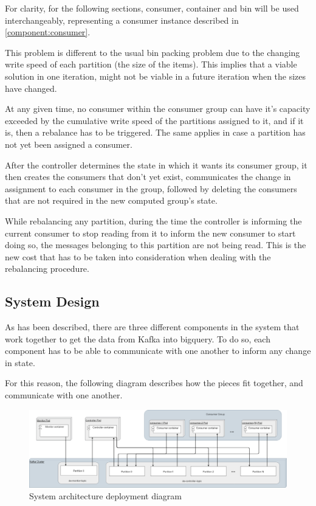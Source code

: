 For clarity, for the following sections, consumer, container and bin will be used interchangeably, representing a consumer instance described in \ref{component:consumer}.

This problem is different to the usual bin packing problem due to the changing write speed of each partition (the size of the items). This implies that a viable solution in one iteration, might not be viable in a future iteration when the sizes have changed.

At any given time, no consumer within the consumer group can have it's capacity exceeded by the cumulative write speed of the partitions assigned to it, and if it is, then a rebalance has to be triggered. The same applies in case a partition has not yet been assigned a consumer.

After the controller determines the state in which it wants its consumer group, it then creates the consumers that don't yet exist, communicates the change in assignment to each consumer in the group, followed by deleting the consumers that are not required in the new computed group's state.

While rebalancing any partition, during the time the controller is informing the current consumer to stop reading from it to inform the new consumer to start doing so, the messages belonging to this partition are not being read. This is the new cost that has to be taken into consideration when dealing with the rebalancing procedure.

\subsection{System Design}

As has been described, there are three different components in the system that work together to get the data from Kafka into bigquery. To do so, each component has to be able to communicate with one another to inform any change in state. 

For this reason, the following diagram describes how the pieces fit together, and communicate with one another.

\begin{figure}[H]
    \centering
    \includegraphics[width=\textwidth]{images/System Design.png}
\caption{System architecture deployment diagram}
\label{fig:system_architecture}
\end{figure}

